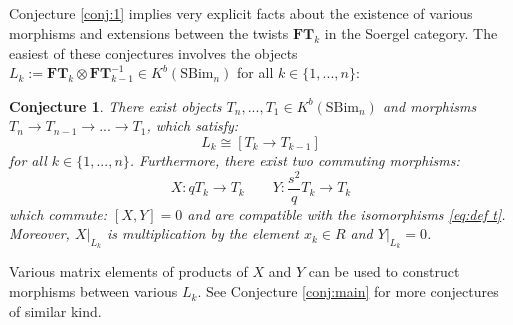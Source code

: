 \documentclass[12pt]{amsart}
\numberwithin{equation}{section}
\newtheorem{conjecture}[theorem]{Conjecture}
\theoremstyle{definition}
\theoremstyle{remark}
\newcommand{\FT}{\mathbf{FT}}
\renewcommand{\1}{\mathbf{1}}
\newcommand{\SBim}{\mathrm{SBim}}
\begin{document}
\subsection{} Conjecture \ref{conj:1} implies very explicit facts about the existence of various morphisms and extensions between the twists $\FT_k$ in the Soergel category. The easiest of these conjectures involves the objects $L_k:=\FT_k\otimes \FT_{k-1}^{-1} \in K^b(\SBim_n)$ for all $k\in \{1,...,n\}$:

\begin{conjecture}
\label{conj:T soergel}
There exist objects $T_n,...,T_1 \in K^b(\SBim_n)$ and morphisms $T_n \rightarrow T_{n-1} \rightarrow ... \rightarrow T_1$, which satisfy:
\begin{equation}
\label{eq:def t}
L_k \cong [T_k \rightarrow T_{k-1}]
\end{equation}
for all $k \in \{1,...,n\}$. Furthermore, there exist two commuting morphisms: 
$$
X:q T_k \to T_k \qquad Y: \frac {s^2}q T_k \to T_k
$$
which commute: $[X,Y]=0$ and are compatible with the isomorphisms \eqref{eq:def t}. Moreover, $X|_{L_k}$ is multiplication by the element $x_k \in R$ and $Y|_{L_k} = 0$.
\end{conjecture}

Various matrix elements of products of $X$ and $Y$ can be used to construct morphisms between various $L_k$. See Conjecture \ref{conj:main} for more conjectures of similar kind.
\end{document}
